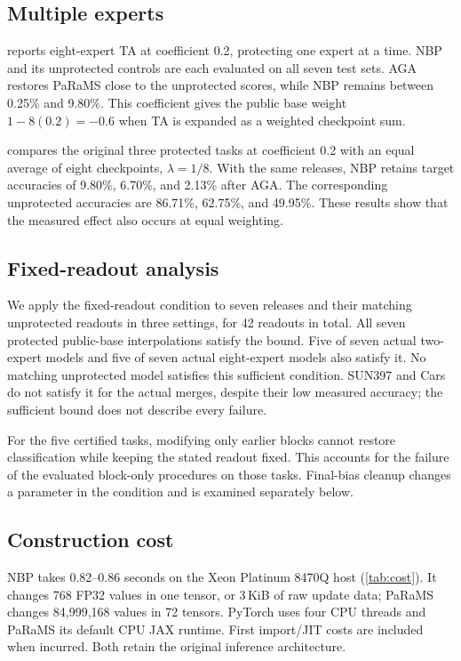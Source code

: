 \subsection{Multiple experts}
 reports eight-expert TA at coefficient 0.2, protecting one expert at a time. NBP and its unprotected controls are each evaluated on all seven test sets. AGA restores PaRaMS close to the unprotected scores, while NBP remains between 0.25\% and 9.80\%. This coefficient gives the public base weight $1-8(0.2)=-0.6$ when TA is expanded as a weighted checkpoint sum.


 compares the original three protected tasks at coefficient 0.2 with an equal average of eight checkpoints, $\lambda=1/8$. With the same releases, NBP retains target accuracies of 9.80\%, 6.70\%, and 2.13\% after AGA. The corresponding unprotected accuracies are 86.71\%, 62.75\%, and 49.95\%. These results show that the measured effect also occurs at equal weighting.

\subsection{Fixed-readout analysis}

We apply the fixed-readout condition to seven releases and their matching unprotected readouts in three settings, for 42 readouts in total. All seven protected public-base interpolations satisfy the bound. Five of seven actual two-expert models and five of seven actual eight-expert models also satisfy it. No matching unprotected model satisfies this sufficient condition. SUN397 and Cars do not satisfy it for the actual merges, despite their low measured accuracy; the sufficient bound does not describe every failure.

For the five certified tasks, modifying only earlier blocks cannot restore classification while keeping the stated readout fixed. This accounts for the failure of the evaluated block-only procedures on those tasks. Final-bias cleanup changes a parameter in the condition and is examined separately below.

\subsection{Construction cost}

NBP takes 0.82--0.86 seconds on the Xeon Platinum 8470Q host (\cref{tab:cost}). It changes 768 FP32 values in one tensor, or 3\,KiB of raw update data; PaRaMS changes 84,999,168 values in 72 tensors. PyTorch uses four CPU threads and PaRaMS its default CPU JAX runtime. First import/JIT costs are included when incurred. Both retain the original inference architecture.


